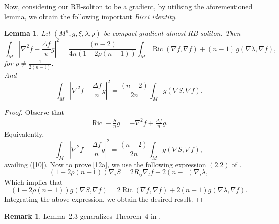 \documentclass[a4paper, twoside, 10pt]{article}
\numberwithin{equation}{section}
\newtheorem{lemma}{Lemma}[section]
\theoremstyle{definition}
\newtheorem{remark}{Remark}[section]
\begin{document}
 Now, considering our RB-soliton to be a gradient, by utilising the aforementioned lemma, we obtain 
the following important {\it Ricci identity}.




\begin{lemma}\label{lem3}
    Let $(M^{n}, g, \xi, \lambda,\rho)$ be compact gradient almost RB-soliton. Then 
 \begin{equation}\label{12a}
        \int_M\left|\nabla^2 f - \frac{\Delta f}{n}g\right|^{2}=\frac{(n-2)}{4n(1-2\rho(n-1))}\int_M \operatorname{Ric}(\nabla f, \nabla f)+ (n-1)\,g(\nabla\lambda,\nabla f),
    \end{equation}
for  $\rho\neq\frac{1}{2(n-1)}$. \\
\mbox{And}
    \begin{equation}\label{11a}
        \int_M\left|\nabla^2 f - \frac{\Delta f}{n}g\right|^{2}=\frac{(n-2)}{2n}\int_M g(\nabla S,\nabla f).
    \end{equation}
\end{lemma}
\begin{proof}
 Observe that
\begin{align}
    \operatorname{Ric} - \frac{S}{n}g =-\nabla^2 f + \frac{\Delta f}{n}g.\label{2.15}
\end{align}
 Equivalently,
  \begin{equation}
        \int_M\left|\nabla^2 f - \frac{\Delta f}{n}g\right|^{2}=\frac{(n-2)}{2n}\int_M g(\nabla S,\nabla f),
    \end{equation}
availing (\ref{10}). Now to prove \eqref{12a}, we use the following expression $(2.2)$ 
of \cite{SDRBS}.$$
(1-2\rho(n-1))\nabla_i S = 2 R_{ij} \nabla_l f + 2(n-1)\nabla_i\lambda,
$$
Which implies that
$$
(1-2\rho(n-1))g(\nabla S,\nabla f) = 2 \operatorname{Ric} (\nabla f,\nabla f) + 2(n-1)g(\nabla\lambda,\nabla f).
$$
 Integrating the above expression, we obtain the desired result. 
\end{proof}

\begin{remark}
Lemma~2.3 generalizes Theorem~4 in \cite{barros2012some}.
\end{remark}
\end{document}
